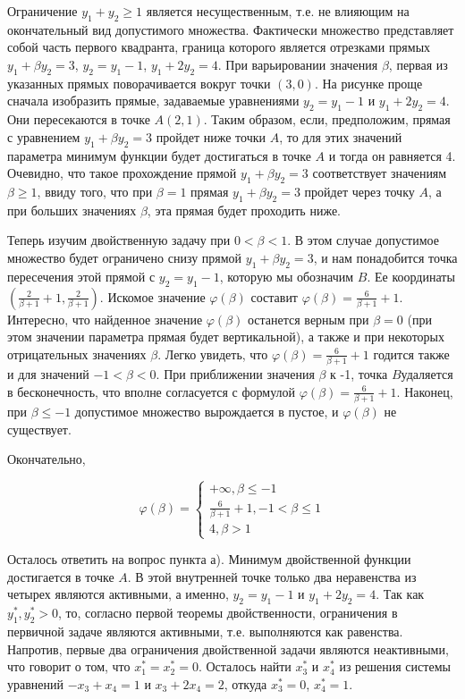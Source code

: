 \begin{problem}
\begin{sol}
\begin{tikzpicture}
\end{tikzpicture}


Ограничение $y_{1} +y_{2} \ge 1$ является несущественным, т.е. не влияющим на окончательный вид допустимого множества. Фактически множество представляет собой часть первого квадранта, граница которого является отрезками прямых $y_{1} +\beta y_{2} =3$, $y_{2} =y_{1} -1$, $y_{1} +2y_{2} =4$. При варьировании значения $\beta $, первая из указанных прямых поворачивается вокруг точки $(3,0)$. На рисунке проще сначала изобразить прямые, задаваемые уравнениями $y_{2} =y_{1} -1$ и $y_{1} +2y_{2} =4$. Они пересекаются в точке $A(2,1)$. Таким образом, если, предположим, прямая с уравнением  $y_{1} +\beta y_{2} =3$ пройдет ниже точки $A$, то для этих значений параметра минимум функции будет достигаться в точке $A$ и тогда он равняется 4. Очевидно, что такое прохождение прямой $y_{1} +\beta y_{2} =3$ соответствует значениям $\beta \ge 1$, ввиду того, что при $\beta =1$ прямая $y_{1} +\beta y_{2} =3$ пройдет через точку $A$, а при больших значениях $\beta $, эта прямая будет проходить ниже.

Теперь изучим двойственную задачу при $0<\beta <1$. В этом случае допустимое множество будет ограничено снизу прямой $y_{1} +\beta y_{2} =3$, и нам понадобится точка пересечения этой прямой с $y_{2} =y_{1} -1$, которую мы обозначим $B$. Ее координаты $\left(\frac{2}{\beta +1} +1,\frac{2}{\beta +1} \right)$. Искомое значение $\varphi (\beta )$ составит $\varphi (\beta )=\frac{6}{\beta +1} +1$. Интересно, что найденное значение $\varphi (\beta )$ останется верным при $\beta =0$ (при этом значении параметра прямая будет вертикальной), а также и при некоторых отрицательных значениях $\beta $. Легко увидеть, что $\varphi (\beta )=\frac{6}{\beta +1} +1$ годится также и для значений $-1<\beta <0$. При приближении значения $\beta $ к -1, точка $B$удаляется в бесконечность, что вполне согласуется с формулой $\varphi (\beta )=\frac{6}{\beta +1} +1$. Наконец, при $\beta \le -1$ допустимое множество вырождается в пустое, и $\varphi (\beta )$ не существует.

Окончательно,

\[\varphi (\beta )=\left\{\begin{array}{l} {+\infty , \beta \le -1} \\ {\frac{6}{\beta +1} +1, -1<\beta \le 1} \\ {4, \beta >1} \end{array}\right. \]

Осталось ответить на вопрос пункта а). Минимум двойственной функции достигается в точке $A$. В этой внутренней точке только два неравенства из четырех являются активными, а именно, $y_{2} =y_{1} -1$ и $y_{1} +2y_{2} =4$. Так как $y_{1}^{*} , y_{2}^{*} >0$, то, согласно первой теоремы двойственности, ограничения в первичной задаче являются активными, т.е. выполняются как равенства. Напротив, первые два ограничения двойственной задачи являются неактивными, что говорит о том, что $x_{1}^{*} =x_{2}^{*} =0$. Осталось найти $x_{3}^{*} $ и $x_{4}^{*} $ из решения системы уравнений $-x_{3} +x_{4} =1$ и $x_{3} +2x_{4} =2$, откуда $x_{3}^{*} =0$, $x_{4}^{*} =1$.


\end{sol}
\end{problem}
